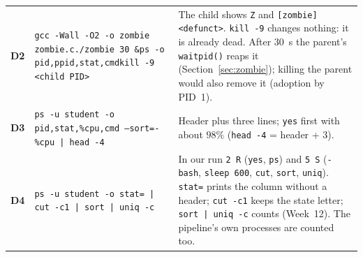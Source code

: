 \documentclass[11pt,a4paper]{article}
\newcommand{\cmd}[1]{\texttt{#1}}
\begin{document}
{\begin{longtable}{@{}p{0.6cm}>{\raggedright\arraybackslash}p{7.3cm}>{\raggedright\arraybackslash}p{7.6cm}@{}}
\textbf{D2} & \texttt{gcc -Wall -O2 -o zombie zombie.c}\newline \texttt{./zombie 30 \&}\newline \texttt{ps -o pid,ppid,stat,cmd}\newline \texttt{kill -9 <child PID>} & The child shows \texttt{Z} and \texttt{[zombie] <defunct>}. \cmd{kill -9} changes nothing: it is already dead. After $30$~s the parent's \cmd{waitpid()} reaps it (Section~\ref{sec:zombie}); killing the parent would also remove it (adoption by PID~1).\\
\textbf{D3} & \texttt{ps -u student -o pid,stat,\%cpu,cmd --sort=-\%cpu | head -4} & Header plus three lines; \cmd{yes} first with about $98\%$ (\texttt{head -4} = header + $3$).\\
\textbf{D4} & \texttt{ps -u student -o stat= | cut -c1 | sort | uniq -c} & In our run \texttt{2 R} (\cmd{yes}, \cmd{ps}) and \texttt{5 S} (\texttt{-bash}, \texttt{sleep 600}, \cmd{cut}, \cmd{sort}, \cmd{uniq}). \texttt{stat=} prints the column without a header; \cmd{cut -c1} keeps the state letter; \cmd{sort | uniq -c} counts (Week~12). The pipeline's own processes are counted too.\\
\bottomrule
\end{longtable}
}
\end{document}
